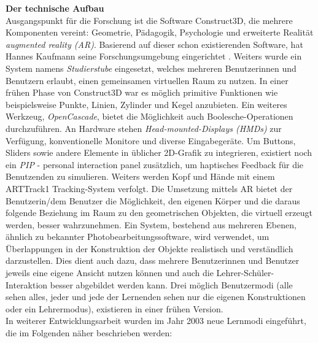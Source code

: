 \documentclass[deutsch]{llncs}
\begin{document}
\textbf{Der technische Aufbau} \\
Ausgangspunkt für die Forschung ist die Software Construct3D, die mehrere Komponenten vereint: Geometrie, Pädagogik, Psychologie und erweiterte Realität \emph{augmented reality (AR)}.
Basierend auf dieser schon existierenden Software, hat Hannes Kaufmann seine Forschungsumgebung eingerichtet \cite{Kaufmann:2002:MGE:1242073.1242086}. 
Weiters wurde ein System namens \emph{Studierstube} eingesetzt, welches mehreren Benutzerinnen und Benutzern erlaubt, einen gemeinsamen virtuellen Raum zu nutzen.
In einer frühen Phase von Construct3D war es möglich primitive Funktionen wie beispielsweise Punkte, Linien, Zylinder und Kegel anzubieten.
Ein weiteres Werkzeug, \emph{OpenCascade}, bietet die Möglichkeit auch Boolesche-Operationen durchzuführen.
An Hardware stehen \emph{Head-mounted-Displays (HMDs)} zur 
Verfügung, konventionelle Monitore und diverse Eingabegeräte. Um Buttons, Sliders sowie andere Elemente in üblicher 2D-Grafik zu integrieren, existiert noch ein \emph{PIP} - personal interaction panel zusätzlich, um haptisches Feedback für die Benutzenden zu simulieren. Weiters werden Kopf und Hände mit einem ARTTrack1 Tracking-System verfolgt.
Die Umsetzung mittels AR bietet der Benutzerin/dem Benutzer die Möglichkeit, den eigenen Körper und die daraus folgende Beziehung im Raum zu den geometrischen Objekten, die virtuell erzeugt werden,
besser wahrzunehmen. 
Ein System, bestehend aus mehreren Ebenen, ähnlich zu bekannter Photobearbeitungssoftware, wird verwendet, um Überlappungen in der Konstruktion der Objekte realistisch und verständlich darzustellen. Dies dient auch dazu, dass mehrere Benutzerinnen und Benutzer jeweils eine eigene Ansicht nutzen können und auch die Lehrer-Schüler-Interaktion besser abgebildet werden kann. 
Drei möglich Benutzermodi (alle sehen alles, jeder und jede der Lernenden sehen nur die eigenen Konstruktionen oder ein Lehrermodus), existieren in einer frühen Version. \\
In weiterer Entwicklungsarbeit wurden im Jahr 2003 neue Lernmodi eingeführt, die im Folgenden näher beschrieben werden: \\
\noindent \\
\end{document}
